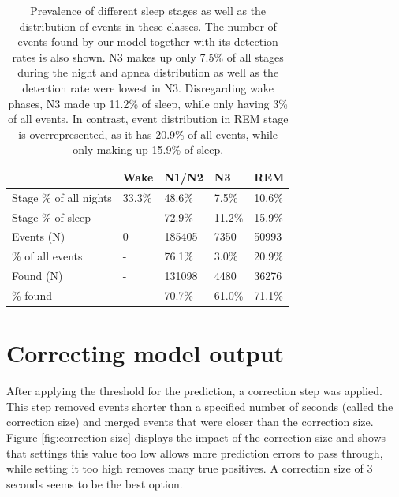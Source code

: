 \renewcommand{\arraystretch}{1.5}
\begin{table}
    \centering
    \begin{tabular}{ l p{1.6cm} p{1.6cm} p{1.6cm} p{1.6cm} }
        & Wake & N1/N2 & N3 & REM \\
        \hline
        Stage \% of all nights & 33.3\% & 48.6\% & 7.5\% & 10.6\% \\
        Stage \% of sleep & - & 72.9\% & 11.2\% & 15.9\% \\
        \hline
        Events (N) & 0 & 185405 & 7350 & 50993 \\
        \% of all events & - & 76.1\% & 3.0\% & 20.9\% \\
        \hline
        Found (N) & - & 131098 & 4480 & 36276 \\
        \% found & - & 70.7\% & 61.0\% & 71.1\% \\
    \end{tabular}
    \caption{Prevalence of different sleep stages as well as the distribution of events in these classes. The number of events found by our model together with its detection rates is also shown. N3 makes up only 7.5\% of all stages during the night and apnea distribution as well as the detection rate were lowest in N3. Disregarding wake phases, N3 made up 11.2\% of sleep, while only having 3\% of all events. In contrast, event distribution in REM stage is overrepresented, as it has 20.9\% of all events, while only making up 15.9\% of sleep. \label{tab:sleep-stage-distribution}}
\end{table}

\section{Correcting model output}

After applying the threshold for the prediction, a correction step was applied. This step removed events shorter than a specified number of seconds (called the correction size) and merged events that were closer than the correction size. Figure \ref{fig:correction-size} displays the impact of the correction size and shows that settings this value too low allows more prediction errors to pass through, while setting it too high removes many true positives. A correction size of 3 seconds seems to be the best option.

